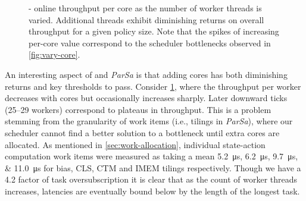 \begin{figure}
	\caption[\approachshort{}-\coopfw{}'s online throughput per core as the number of worker threads is varied.]{\approachshort{}-\coopfw{} online throughput per core as the number of worker threads is varied. Additional threads exhibit diminishing returns on overall throughput for a given policy size. Note that the spikes of increasing per-core value correspond to the scheduler bottlenecks observed in \cref{fig:vary-core}.\label{fig:tput-per-core}}
\end{figure}

An interesting aspect of \Coopfw{} and \emph{ParSa} is that adding cores has both diminishing returns and key thresholds to pass.
Consider \cref{fig:tput-per-core}, where the throughput per worker decreases with cores but occasionally increases sharply.
Later downward ticks (\numrange{25}{29} workers) correspond to plateaus in throughput.
This is a problem stemming from the granularity of work items (i.e., tilings in \emph{ParSa}), where our scheduler cannot find a better solution to a bottleneck until extra cores are allocated.
As mentioned in \cref{sec:work-allocation}, individual state-action computation work items were measured as taking a mean \qtylist{5.2; 6.2; 9.7; 11.0}{\micro\second} for bias, CLS, CTM and IMEM tilings respectively.
Though we have a \qty{4.2}{\times} factor of task oversubscription it is clear that as the count of worker threads increases, latencies are eventually bound below by the length of the longest task.

